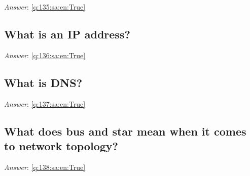 \documentclass[a4paper,11pt,oneside]{article}
\begin{document}
\begin{sloppypar}
\label{q:135:sa:en:False}

\vspace{2cm}

\noindent\makebox[\textwidth]{\hrulefill}

\vspace{1cm}

\textit{Answer}: \autoref{q:135:sa:en:True}



\subsection{What is an IP address?}

\label{q:136:sa:en:False}

\vspace{2cm}

\noindent\makebox[\textwidth]{\hrulefill}

\vspace{1cm}

\textit{Answer}: \autoref{q:136:sa:en:True}



\subsection{What is DNS?}

\label{q:137:sa:en:False}

\vspace{2cm}

\noindent\makebox[\textwidth]{\hrulefill}

\vspace{1cm}

\textit{Answer}: \autoref{q:137:sa:en:True}



\subsection{What does bus and star mean when it comes to network topology?}

\label{q:138:sa:en:False}

\vspace{2cm}

\noindent\makebox[\textwidth]{\hrulefill}

\vspace{1cm}

\textit{Answer}: \autoref{q:138:sa:en:True}




\end{sloppypar}
\end{document}

